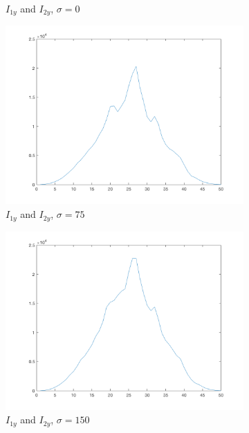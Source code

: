 \begin{figure}[htpb]
\begin{subfigure}{.25\textwidth}
\caption{$I_{1y}$ and $I_{2y}$, $\sigma\!=\!0$}
\end{subfigure}%
\begin{subfigure}{.25\textwidth}
\includegraphics[width=1\textwidth]{img/ProjXI2sigma75}
\caption{$I_{1y}$ and $I_{2y}$, $\sigma\!=\!75$}
\end{subfigure}%
\begin{subfigure}{.25\textwidth}
\includegraphics[width=1\textwidth]{img/ProjXI2sigma150}
\caption{$I_{1y}$ and $I_{2y}$, $\sigma\!=\!150$}
\end{subfigure}%
\begin{subfigure}{.25\textwidth}

\end{subfigure}
\end{figure}

